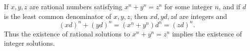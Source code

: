 If $x, y, z$ are rational numbers satisfying $x^n + y^n = z^n$ for some integer $n$, and if $d$ is the least common denominator of $x, y, z$, then $xd, yd, zd$ are integers and
$$(xd)^n + (yd)^n = (x^n + y^n)d^n = (zd)^n.$$
Thus the existence of rational solutions to $x^n + y^n = z^n$ implies the existence of integer solutions.

